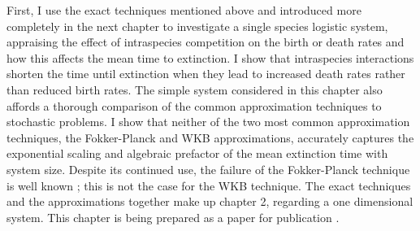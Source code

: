 First, I use the exact techniques mentioned above and introduced more completely in the next chapter to investigate a single species logistic system, appraising the effect of intraspecies competition on the birth or death rates and how this affects the mean time to extinction. 
I show that intraspecies interactions shorten the time until extinction when they lead to increased death rates rather than reduced birth rates. 
The simple system considered in this chapter also affords a thorough comparison of the common approximation techniques to stochastic problems. %
I show that neither of the two most common approximation techniques, the Fokker-Planck and WKB approximations, accurately captures the exponential scaling and algebraic prefactor of the mean extinction time with system size. 
Despite its continued use, the failure of the Fokker-Planck technique is well known \cite{Grasman1983,Doering2005,Ovaskainen2010,Yu2017}; this is not the case for the WKB technique. 
The exact techniques and the approximations together make up chapter 2, regarding a one dimensional system. 
This chapter is being prepared as a paper for publication \cite{Badali2019b}. 

